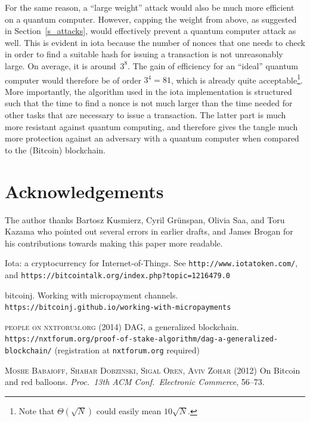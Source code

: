 \documentclass[12pt]{article}
\begin{document}
\begin{CJK}{UTF8}{bkai}
For the same reason, a ``large weight'' attack would also be much more 
efficient on a quantum computer.
However, capping the weight from above, as suggested
in Section~\ref{s_attacks}, would effectively prevent
a quantum computer attack as well. This is evident in iota because 
the number of nonces that one needs to check in order
to find a suitable hash for issuing a transaction is not 
unreasonably large. On average, it is around~$3^8$. 
The gain of efficiency for 
an ``ideal'' quantum computer would therefore
be of order $3^{4}=81$, which is already quite 
acceptable\footnote{Note that $\Theta(\sqrt{N})$
could easily mean $10\sqrt{N}$.}.
More importantly, the algorithm used in the iota implementation 
is structured such that the time to find a nonce is 
not much larger than the time needed for other tasks that 
are necessary to issue a transaction. The latter part is much
 more resistant against quantum computing, and therefore 
 gives the tangle much more protection against an adversary with a 
 quantum computer when compared to the (Bitcoin) blockchain.



\section*{Acknowledgements}
The author thanks  Bartosz Kusmierz, Cyril Gr\"unspan,
Olivia Saa, and
 Toru Kazama who pointed
out several errors in earlier drafts, and James Brogan
for his contributions towards making this paper more readable.



\begin{thebibliography}{9}
 Iota: a cryptocurrency for Internet-of-Things.
See \texttt{http://www.iotatoken.com/}, and
\texttt{https://bitcointalk.org/index.php?topic=1216479.0}

  bitcoinj.  
Working with micropayment channels.\\
\texttt{https://bitcoinj.github.io/working-with-micropayments}

\textsc{people on nxtforum.org}  (2014)
DAG, a generalized blockchain.
\texttt{https://nxtforum.org/proof-of-stake-algorithm/dag-a-generalized-blockchain/}  (registration at \texttt{nxtforum.org} required)

\textsc{Moshe Babaioff, Shahar Dobzinski, Sigal Oren, Aviv Zohar} (2012)
On Bitcoin and red balloons.
\textit{Proc.\ 13th ACM Conf.\ Electronic Commerce}, 56--73. 



\end{thebibliography}
\end{CJK}
\end{document}
